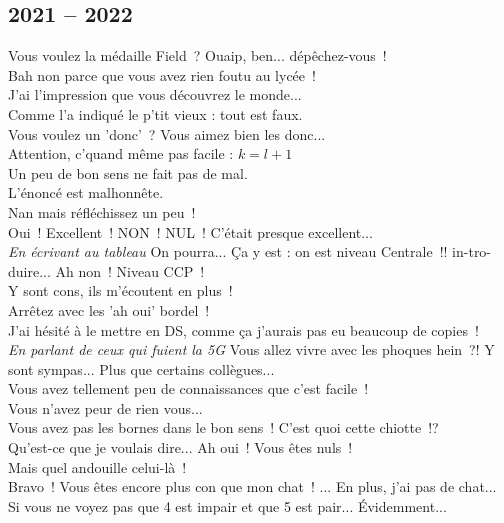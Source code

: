\documentclass[french, a4paper, openany]{book}
\begin{document}
	\subsection*{2021 -- 2022}
		\noindent \og Vous voulez la médaille Field~? Ouaip, ben... dépêchez-vous~! \fg \\
		\og Bah non parce que vous avez rien foutu au lycée~! \fg \\
		\og J'ai l'impression que vous découvrez le monde... \fg \\
		\og Comme l'a indiqué le p'tit vieux : tout est faux. \fg \\
		\og Vous voulez un 'donc'~? Vous aimez bien les donc... \fg \\
		\og Attention, c'quand même pas facile : $k = l+ 1$ \fg \\
		\og Un peu de bon sens ne fait pas de mal. \fg \\
		\og L'énoncé est malhonnête. \fg \\
		\og Nan mais réfléchissez un peu~! \fg \\
		\og Oui~! Excellent~! NON~! NUL~! C'était presque excellent... \fg \\
		\emph{En écrivant au tableau} \og On pourra... Ça y est : on est niveau Centrale~!! in-tro-duire... Ah non~! Niveau CCP~! \fg \\
		\og Y sont cons, ils m'écoutent en plus~! \fg \\
		\og Arrêtez avec les 'ah oui' bordel~! \fg \\
		\og J'ai hésité à le mettre en DS, comme ça j'aurais pas eu beaucoup de copies~!\fg \\
		\emph{En parlant de ceux qui fuient la 5G} \og Vous allez vivre avec les phoques hein~?! Y sont sympas... Plus que certains collègues... \fg \\
		\og Vous avez tellement peu de connaissances que c'est facile~! \fg \\
		\og Vous n'avez peur de rien vous... \fg \\	
		\og Vous avez pas les bornes dans le bon sens~! C'est quoi cette chiotte~!? \fg \\
		\og Qu'est-ce que je voulais dire... Ah oui~! Vous êtes nuls~! \fg \\
		\og Mais quel andouille celui-là~! \fg \\
		\og Bravo~! Vous êtes encore plus con que mon chat~! ... En plus, j'ai pas de chat... \fg \\
		\og Si vous ne voyez pas que 4 est impair et que 5 est pair... Évidemment... \fg \\
\end{document}
